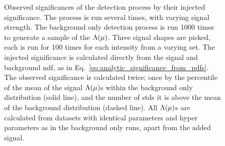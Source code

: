 \documentclass[paper/ddppaper2.tex]{subfiles}
\begin{document}
 

\begin{figure}
    \caption{Observed significances of the detection process by their injected significance. The process is run several times, with varying signal strength. The background only detection process is run 1000 times to generate a sample of the $\Lambda({\mu})$. Three signal shapes are picked, each is run for 100 times for each intensity from a varying set. The injected significance is calculated directly from the signal and background \gls{ndf}, as in Eq.~\ref{eq:analytic_significance_from_pdfs}. The observed significance is calculated twice; once by the percentile of the mean of the signal $\Lambda({\mu})$s within the background only distribution (solid line), and the number of \glspl{std} it is above the mean of the background distribution (dashed line). All $\Lambda({\mu})$s are calculated from datasets with identical parameters and hyper parameters as in the background only runs, apart from the added signal.}
    \label{fig:observed_vs_injected_significances}
\end{figure}


\ifdefined\paper\clearpage\fi
\end{document}
